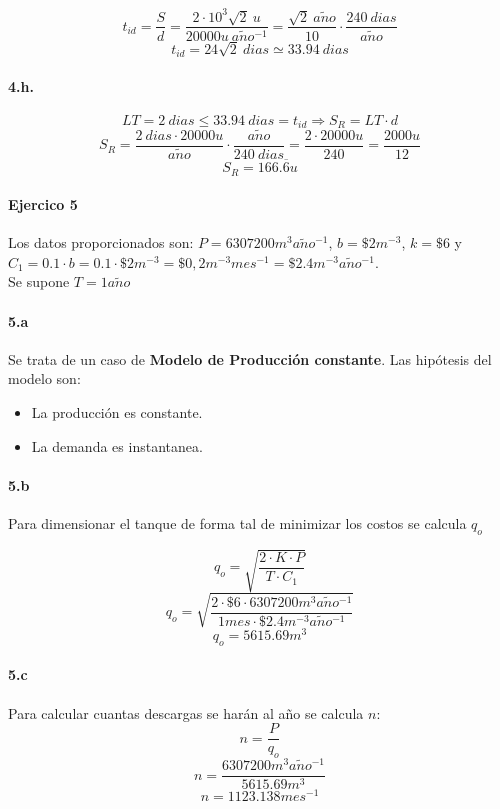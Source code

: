 \documentclass{article}
\def \anio {a\tilde{n}o}
\begin{document}
        $$ t_{id} = \frac{S}{d} = \frac{2 \cdot 10^3 \sqrt {2}\ u}{20000u\ \anio^{-1}} = \frac{\sqrt{2}\ \anio}{10} \cdot \frac{240\ dias}{\anio} $$
        $$ \boxed{ t_{id} = 24\sqrt{2}\ dias \simeq 33.94\ dias } $$
    
    \paragraph{4.h.}
        $$ LT = 2\ dias \leq 33.94\ dias = t_{id} \Rightarrow S_R = LT \cdot d $$
        $$ S_R = \frac{2\ dias \cdot 20000u}{\anio} \cdot \frac{\anio}{240\ dias} = \frac{2 \cdot 20000u}{240} = \frac{2000u}{12} $$
        $$ \boxed{S_R = 166.\overline{6} u} $$


\paragraph{Ejercico 5}
Los datos proporcionados son: $P = 6307200 m^3 \anio^{-1} $, $b = \$2 m^{-3} $, $k = \$6 $ y $C_1 = 0.1 \cdot b = 0.1 \cdot \$2 m^{-3} = \$0,2 m^{-3}mes^{-1} = \$2.4 m^{-3}\anio^{-1} $. \\
Se supone $T = 1 \anio$
  \paragraph{5.a}
  Se trata de un caso de {\bf Modelo de Producci\'on constante}. Las hip\'otesis del modelo son:
 \begin{itemize}
  \item La producci\'on es constante.
  \item La demanda es instantanea.
 \end{itemize}

  \paragraph{5.b}
  Para dimensionar el tanque de forma tal de minimizar los costos se calcula $q_o$
  
  $$q_o = \sqrt{\frac{2 \cdot K \cdot P}{T \cdot C_1}}$$
  $$q_o = \sqrt{\frac{2 \cdot \$6 \cdot 6307200 m^3 \anio^{-1}}{1 mes \cdot \$2.4 m^{-3}\anio^{-1}}} $$
  $$\boxed{q_o = 5615.69 m^3} $$

  \paragraph{5.c}
  Para calcular cuantas descargas se har\'an al a\~no se calcula $n$:
  $$n = \frac{P}{q_o} $$
  $$n = \frac{6307200 m^3 \anio^{-1}}{5615.69 m^3} $$
  $$\boxed{n = 1123.138 mes^{-1}} $$
\end{document}
